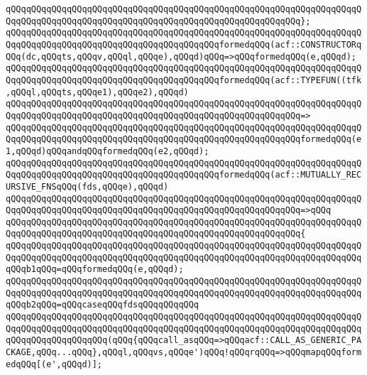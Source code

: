 \verb|qQQqqQQqqQQqqQQqqQQqqQQqqQQqqQQqqQQqqQQqqQQqqQQqqQQqqQQqqQQqqQQqqQQqqQQqqQQqqQQqqQQqqQQqqQQqqQQqqQQqqQQqqQQqqQQqqQQqqQQqqQQqqQQq};|\newline
\verb|qQQqqQQqqQQqqQQqqQQqqQQqqQQqqQQqqQQqqQQqqQQqqQQqqQQqqQQqqQQqqQQqqQQqqQQqqQQqqQQqqQQqqQQqqQQqqQQqqQQqqQQqqQQqqQQqformedqQQq(acf::CONSTRUCTORqQQq(dc,qQQqts,qQQqv,qQQql,qQQqe),qQQqd)qQQq=>qQQqformedqQQq(e,qQQqd);|\newline
\newline
\verb|qQQqqQQqqQQqqQQqqQQqqQQqqQQqqQQqqQQqqQQqqQQqqQQqqQQqqQQqqQQqqQQqqQQqqQQqqQQqqQQqqQQqqQQqqQQqqQQqqQQqqQQqqQQqqQQqformedqQQq(acf::TYPEFUN((tfk,qQQql,qQQqts,qQQqe1),qQQqe2),qQQqd)|\newline
\verb|qQQqqQQqqQQqqQQqqQQqqQQqqQQqqQQqqQQqqQQqqQQqqQQqqQQqqQQqqQQqqQQqqQQqqQQqqQQqqQQqqQQqqQQqqQQqqQQqqQQqqQQqqQQqqQQqqQQqqQQqqQQqqQQq=>|\newline
\verb|qQQqqQQqqQQqqQQqqQQqqQQqqQQqqQQqqQQqqQQqqQQqqQQqqQQqqQQqqQQqqQQqqQQqqQQqqQQqqQQqqQQqqQQqqQQqqQQqqQQqqQQqqQQqqQQqqQQqqQQqqQQqqQQqformedqQQq(e1,qQQqd)qQQqandqQQqformedqQQq(e2,qQQqd);|\newline
\newline
\verb|qQQqqQQqqQQqqQQqqQQqqQQqqQQqqQQqqQQqqQQqqQQqqQQqqQQqqQQqqQQqqQQqqQQqqQQqqQQqqQQqqQQqqQQqqQQqqQQqqQQqqQQqqQQqqQQqformedqQQq(acf::MUTUALLY_RECURSIVE_FNSqQQq(fds,qQQqe),qQQqd)|\newline
\verb|qQQqqQQqqQQqqQQqqQQqqQQqqQQqqQQqqQQqqQQqqQQqqQQqqQQqqQQqqQQqqQQqqQQqqQQqqQQqqQQqqQQqqQQqqQQqqQQqqQQqqQQqqQQqqQQqqQQqqQQqqQQqqQQq=>qQQq|\newline
\verb|qQQqqQQqqQQqqQQqqQQqqQQqqQQqqQQqqQQqqQQqqQQqqQQqqQQqqQQqqQQqqQQqqQQqqQQqqQQqqQQqqQQqqQQqqQQqqQQqqQQqqQQqqQQqqQQqqQQqqQQqqQQqqQQq{|\newline
\verb|qQQqqQQqqQQqqQQqqQQqqQQqqQQqqQQqqQQqqQQqqQQqqQQqqQQqqQQqqQQqqQQqqQQqqQQqqQQqqQQqqQQqqQQqqQQqqQQqqQQqqQQqqQQqqQQqqQQqqQQqqQQqqQQqqQQqqQQqqQQqqQQqb1qQQq=qQQqformedqQQq(e,qQQqd);|\newline
\verb|qQQqqQQqqQQqqQQqqQQqqQQqqQQqqQQqqQQqqQQqqQQqqQQqqQQqqQQqqQQqqQQqqQQqqQQqqQQqqQQqqQQqqQQqqQQqqQQqqQQqqQQqqQQqqQQqqQQqqQQqqQQqqQQqqQQqqQQqqQQqqQQqb2qQQq=qQQqcaseqQQqfdsqQQqqQQqqQQq|\newline
\verb|qQQqqQQqqQQqqQQqqQQqqQQqqQQqqQQqqQQqqQQqqQQqqQQqqQQqqQQqqQQqqQQqqQQqqQQqqQQqqQQqqQQqqQQqqQQqqQQqqQQqqQQqqQQqqQQqqQQqqQQqqQQqqQQqqQQqqQQqqQQqqQQqqQQqqQQqqQQqqQQq(qQQq{qQQqcall_asqQQq=>qQQqacf::CALL_AS_GENERIC_PACKAGE,qQQq...qQQq},qQQql,qQQqvs,qQQqe')qQQq!qQQqrqQQq=>qQQqmapqQQqformedqQQq[(e',qQQqd)];|\newline
